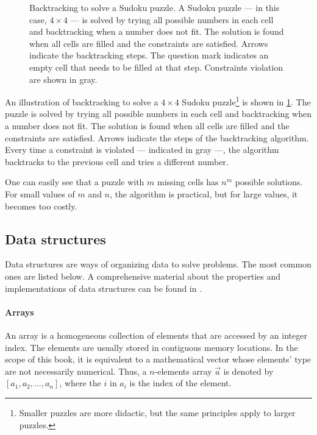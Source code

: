 \begin{figure}
  \caption{
    Backtracking to solve a Sudoku puzzle.
    A Sudoku puzzle --- in this case, $4 \times 4$ --- is solved by trying all possible
    numbers in each cell and backtracking when a number does not fit.  The solution is found
    when all cells are filled and the constraints are satisfied.  Arrows indicate the
    backtracking steps.  The question mark indicates an empty cell that needs to be filled
    at that step.  Constraints violation are shown in gray.
  }
  \label{fig:sudoku}
\end{figure}

An illustration of backtracking to solve a $4 \times 4$ Sudoku puzzle\footnote{%
Smaller puzzles are more didactic, but the same principles apply to larger puzzles.}
is shown in \cref{fig:sudoku}.
The puzzle is solved by trying all possible numbers in each cell and backtracking when a
number does not fit.  The solution is found when all cells are filled and the constraints
are satisfied.  Arrows indicate the steps of the backtracking algorithm.  Every time a
constraint is violated --- indicated in gray ---, the algorithm backtracks to the previous
cell and tries a different number.

One can easily see that a puzzle with $m$ missing cells has $n^m$ possible solutions.  For
small values of $m$ and $n$, the algorithm is practical, but for large values, it becomes
too costly.

\subsection{Data structures}

Data structures are ways of organizing data to solve problems.  The most common ones
are listed below.  A comprehensive material about the properties and implementations of
data structures can be found in \textcite{Cormen2022}.

\paragraph{Arrays}  An array is a homogeneous collection of elements that are accessed by
an integer index.  The elements are usually stored in contiguous memory locations.
In the scope of this book, it is equivalent to a mathematical vector whose elements' type
are not necessarily numerical.  Thus, a $n$-elements array $\vec{a}$ is denoted by
$\left[a_1, a_2, \dots, a_n\right]$, where the $i$ in $a_i$ is the index of the element.

